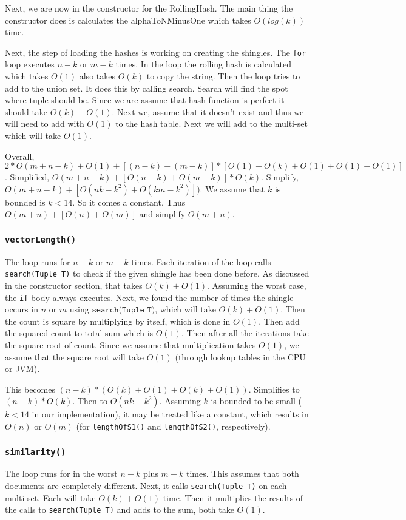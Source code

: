 \documentclass[10pt,letterpaper]{article}
\begin{document}
Next, we are now in the constructor for the RollingHash. The main thing the constructor does is
calculates the alphaToNMinusOne which takes $O(log(k))$ time.

Next, the step of loading the hashes is working on creating the shingles. The \texttt{for} loop executes $n-k$ or $m-k$ 
times. In the loop the rolling hash is calculated which takes $O(1)$ also takes $O(k)$ to copy the string. Then the 
loop tries to add to the union set. It does this by calling search. Search will find the spot where tuple should be. 
Since we are assume that hash function is perfect it should take $O(k) + O(1)$. Next we, assume that it doesn't exist and 
thus we will need to add with $O(1)$ to  the hash table. Next we will add to the multi-set which will take $O(1)$. 

Overall, $2 * O(m + n - k) + O(1) + [(n-k) + (m-k)] * [O(1) + O(k) + O(1) + O(1) + O(1)]$. 
Simplified, $O(m + n - k) + [O(n-k) + O(m-k)] * O(k)$. 
Simplify, $O(m + n - k) + [O(nk-k^2) + O(km-k^2)])$. We assume that $k$ is bounded is $k < 14$. So it comes a constant.
Thus $O(m + n) + [O(n) + O(m)]$ and simplify $O(m + n)$.
\subsubsection{\texttt{vectorLength()}}
The loop runs for $n-k$ or $m-k$ times. Each iteration of the loop calls \texttt{search(Tuple T)} to check if the given shingle has been done before. As discussed in the constructor section, that takes $O(k) + O(1)$. Assuming the worst case, the \texttt{if} body always executes. Next, we found the number of times the shingle occurs in $n$ or $m$ using $ \texttt{search(Tuple T)}$, which will take $O(k) + O(1)$. Then the count is square by multiplying by itself, which is done in $O(1)$. Then add the squared count to total sum which is $O(1)$. Then after all the iterations take the square root of count. Since we assume that multiplication takes $O(1)$, we assume that the square root will take $O(1)$ (through lookup tables in the CPU or JVM).

This becomes $(n-k)*(O(k)+O(1)+O(k)+O(1))$. Simplifies to $(n-k)*O(k)$. Then to $O(nk-k^2)$. Assuming $k$ is bounded to be small ($k<14$ in our implementation), it may be treated like a constant, which results in $O(n)$ or $O(m)$ (for \texttt{lengthOfS1()} and \texttt{lengthOfS2()}, respectively).
\subsubsection{\texttt{similarity()}}
The loop runs for in the worst $n-k$ plus $m-k$ times. This assumes that both documents are completely different. Next, it calls \texttt{search(Tuple T)} on each multi-set. Each will take $O(k) + O(1)$ time. Then it multiplies the results of the calls to \texttt{search(Tuple T)} and adds to the sum, both take $O(1)$.
\end{document}
